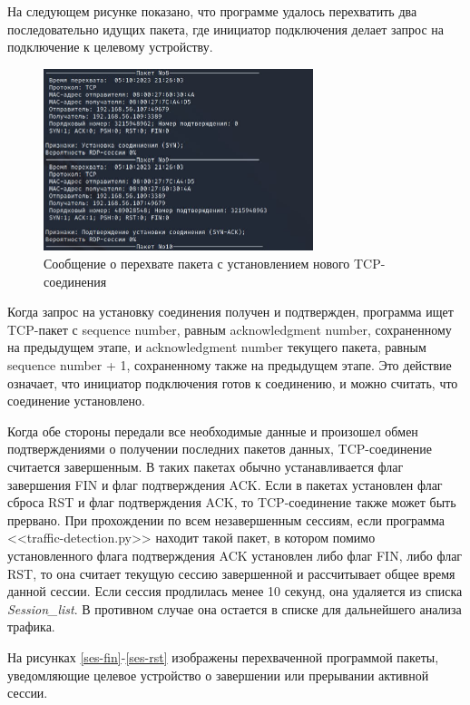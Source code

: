 \documentclass[bachelor, och, coursework]{SCWorks}
\begin{document}
На следующем рисунке показано, что программе удалось перехватить два последовательно идущих пакета, где инициатор подключения делает запрос на
подключение к целевому устройству.

\begin{figure}[H]
  \centering
  \includegraphics[width=0.7\textwidth]{photo/ses-syn.jpg}
  \caption{Сообщение о перехвате пакета с установлением нового TCP-соединения}
  \label{ses-syn}
\end{figure}


Когда запрос на установку соединения получен и подтвержден, программа ищет TCP-пакет с sequence number, равным acknowledgment number, 
сохраненному на предыдущем этапе, и acknowledgment number текущего пакета, равным sequence number + 1, сохраненному также на предыдущем 
этапе. Это действие означает, что инициатор подключения готов к соединению, и можно считать, что соединение установлено.


Когда обе стороны передали все необходимые данные и произошел обмен подтверждениями о получении последних пакетов данных, TCP-соединение считается 
завершенным. В таких пакетах обычно устанавливается флаг завершения FIN и флаг подтверждения ACK. Если в пакетах установлен флаг сброса RST и флаг 
подтверждения ACK, то TCP-соединение также может быть прервано. При прохождении по всем незавершенным сессиям, если программа <<traffic-detection.py>> 
находит такой пакет, в котором помимо установленного флага подтверждения ACK установлен либо флаг FIN, либо флаг RST, то она считает текущую сессию 
завершенной и рассчитывает общее время данной сессии. Если сессия продлилась менее 10 секунд, она удаляется из списка \textit{Session\_list}. В противном 
случае она остается в списке для дальнейшего анализа трафика.

На рисунках \ref{ses-fin}-\ref{ses-rst} изображены перехваченной программой пакеты, уведомляющие целевое устройство о завершении 
или прерывании активной сессии.
\end{document}
